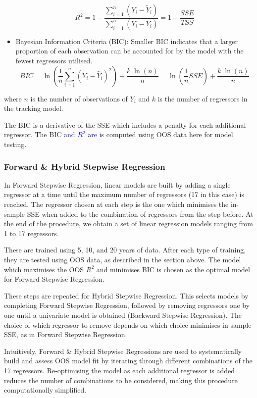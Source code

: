 \documentclass[AER]{AEA}
\begin{document}
\begin{spacing}{2}
\begin{itemize}
    \begin{equation}
        R^2=1-\frac{\sum_{i=1}^n(Y_i-\tilde{Y}_i)}{\sum_{i=1}^n(Y_i-\bar{Y}_i)}=1-\frac{SSE}{TSS}
    \end{equation}

    \item Bayesian Information Criteria (BIC): Smaller BIC indicates that a larger proportion of each observation can be accounted for by the model with the fewest regressors utilised.
\begin{equation} BIC=\ln\left(\frac{1}{n}\sum_{i=1}^n(Y_i-\tilde{Y_i})^2\right)+\frac{k\;\ln(n)}{n}=\ln\left(\frac{1}{n}SSE\right)+\frac{k\;\ln(n)}{n}\label{eq:7}
\end{equation}
\end{itemize}
where $n$ is the number of observations of $Y_i$ and $k$ is the number of regressors in the tracking model.

The BIC is a derivative of the SSE which includes a penalty for each additional regressor. The BIC \textcolor{blue}{and $R^2$ are} is computed using OOS data here for model testing.

\subsubsection{Forward \& Hybrid Stepwise Regression}

In Forward Stepwise Regression, linear models are built by adding a single regressor at a time until the maximum number of regressors (17 in this case) is reached. The regressor chosen at each step is the one which minimises the in-sample SSE when added to the combination of regressors from the step before.  At the end of the procedure, we obtain a set of linear regression models ranging from 1 to 17 regressors.

These are trained using 5, 10, and 20 years of data. After each type of training, they are tested using OOS data, as described in the section above. The model which maximises the OOS \(R^2\) and minimises BIC is chosen as the optimal model for Forward Stepwise Regression.

These steps are repeated for Hybrid Stepwise Regression. This selects models by completing Forward Stepwise Regression, followed by removing regressors one by one until a univariate model is obtained (Backward Stepwise Regression). The choice of which regressor to remove depends on which choice minimises in-sample SSE, as in Forward Stepwise Regression.

Intuitively, Forward \& Hybrid Stepwise Regressions are used to systematically build and assess OOS model fit by iterating through different combinations of the 17 regressors. Re-optimising the model as each additional regressor is added reduces the number of combinations to be considered, making this procedure computationally simplified.


\end{spacing}
\end{document}
